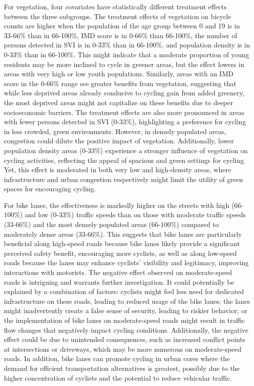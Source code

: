\documentclass[preprint,12pt, authoryear]{elsarticle}
\begin{document}
For vegetation, four covariates have statistically different treatment effects between the three subgroups. The treatment effects of vegetation on bicycle counts are higher when the population of the age group between 0 and 19 is in 33-66\% than in 66-100\%, IMD score is in 0-66\% than 66-100\%, the number of persons detected in SVI is in 0-33\% than in 66-100\%, and population density is in 0-33\% than in 66-100\%. This might indicate that a moderate proportion of young residents may be more inclined to cycle in greener areas, but the effect lowers in areas with very high or low youth populations. Similarly, areas with an IMD score in the 0-66\% range see greater benefits from vegetation, suggesting that while less deprived areas already conducive to cycling gain from added greenery, the most deprived areas might not capitalize on these benefits due to deeper socioeconomic barriers.
The treatment effects are also more pronounced in areas with fewer persons detected in SVI (0-33\%), highlighting a preference for cycling in less crowded, green environments. However, in densely populated areas, congestion could dilute the positive impact of vegetation. Additionally, lower population density areas (0-33\%) experience a stronger influence of vegetation on cycling activities, reflecting the appeal of spacious and green settings for cycling. Yet, this effect is moderated in both very low and high-density areas, where infrastructure and urban congestion respectively might limit the utility of green spaces for encouraging cycling.

For bike lanes, the effectiveness is markedly higher on the streets with high (66-100\%) and low (0-33\%) traffic speeds than on those with moderate traffic speeds (33-66\%) and the most densely populated areas (66-100\%) compared to moderately dense areas (33-66\%). This suggests that bike lanes are particularly beneficial along high-speed roads because bike lanes likely provide a significant perceived safety benefit, encouraging more cyclists, as well as along low-speed roads because the lanes may enhance cyclists' visibility and legitimacy, improving interactions with motorists. The negative effect observed on moderate-speed roads is intriguing and warrants further investigation. It could potentially be explained by a combination of factors: cyclists might feel less need for dedicated infrastructure on these roads, leading to reduced usage of the bike lanes; the lanes might inadvertently create a false sense of security, leading to riskier behavior; or the implementation of bike lanes on moderate-speed roads might result in traffic flow changes that negatively impact cycling conditions. Additionally, the negative effect could be due to unintended consequences, such as increased conflict points at intersections or driveways, which may be more numerous on moderate-speed roads. 
In addition, bike lanes can promote cycling in urban cores where the demand for efficient transportation alternatives is greatest, possibly due to the higher concentration of cyclists and the potential to reduce vehicular traffic. 
\end{document}
